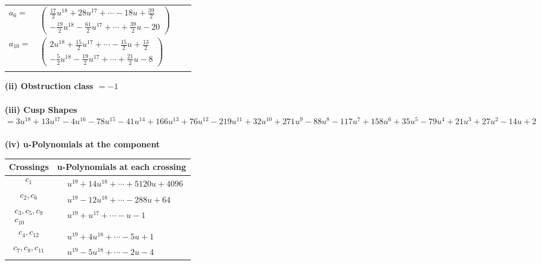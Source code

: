 \documentclass[1p]{elsarticle_modified}
\theoremstyle{definition}
\begin{document}
\begin{tabular}{m{7pt} m{180pt} m{7pt} m{180pt} }
\flushright $a_{6}=$&$\begin{pmatrix}\frac{17}{2} u^{18}+28 u^{17}+\cdots-18 u+\frac{39}{2}\\-\frac{19}{2} u^{18}-\frac{61}{2} u^{17}+\cdots+\frac{39}{2} u-20\end{pmatrix}$ \\
\flushright $a_{10}=$&$\begin{pmatrix}2 u^{18}+\frac{15}{2} u^{17}+\cdots-\frac{15}{2} u+\frac{13}{2}\\-\frac{5}{2} u^{18}-\frac{19}{2} u^{17}+\cdots+\frac{21}{2} u-8\end{pmatrix}$\\&\end{tabular}
\flushleft \textbf{(ii) Obstruction class $= -1$}\\~\\
\flushleft \textbf{(iii) Cusp Shapes $= 3 u^{18}+13 u^{17}-4 u^{16}-78 u^{15}-41 u^{14}+166 u^{13}+76 u^{12}-219 u^{11}+32 u^{10}+271 u^9-88 u^8-117 u^7+158 u^6+35 u^5-79 u^4+21 u^3+27 u^2-14 u+2$}\\~\\
\newpage\renewcommand{\arraystretch}{1}
\flushleft \textbf{(iv) u-Polynomials at the component}\newline \\
\begin{tabular}{m{50pt}|m{274pt}}
Crossings & \hspace{64pt}u-Polynomials at each crossing \\
\hline $$\begin{aligned}c_{1}\end{aligned}$$&$\begin{aligned}
&u^{19}+14 u^{18}+\cdots+5120 u+4096
\end{aligned}$\\
\hline $$\begin{aligned}c_{2},c_{6}\end{aligned}$$&$\begin{aligned}
&u^{19}-12 u^{18}+\cdots-288 u+64
\end{aligned}$\\
\hline $$\begin{aligned}c_{3},c_{5},c_{9}\\c_{10}\end{aligned}$$&$\begin{aligned}
&u^{19}+u^{17}+\cdots- u-1
\end{aligned}$\\
\hline $$\begin{aligned}c_{4},c_{12}\end{aligned}$$&$\begin{aligned}
&u^{19}+4 u^{18}+\cdots-5 u+1
\end{aligned}$\\
\hline $$\begin{aligned}c_{7},c_{8},c_{11}\end{aligned}$$&$\begin{aligned}
&u^{19}-5 u^{18}+\cdots-2 u-4
\end{aligned}$\\
\hline
\end{tabular}\\~\\
\end{document}
